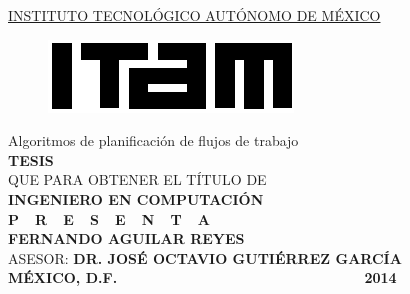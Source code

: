 \begin{titlepage}
\begin{center}

\textsc{\underline{INSTITUTO TECNOLÓGICO AUTÓNOMO DE MÉXICO}}\\[1.5cm] %

\begin{figure}[h]
\centering
\includegraphics[scale=2]{imagenes/logoitam.png}\\[1.4cm] %
\end{figure} 

\huge{Algoritmos de planificación de flujos de trabajo}\\[2.6cm] %

\large \textbf{TESIS}\\ QUE PARA OBTENER EL TÍTULO DE\\ \textbf{INGENIERO EN COMPUTACIÓN}\\[0.8cm]
\large \textbf{P\ \  R\ \  E\ \  S\ \  E\ \  N\ \  T\ \  A}\\[0.8cm]

\textbf{FERNANDO AGUILAR REYES}\\[1.0cm]

\large ASESOR: \textbf{DR. JOSÉ OCTAVIO GUTIÉRREZ GARCÍA}\\[1.4cm]

\large \textbf{MÉXICO, D.F.} {\ \ \ \ \ \ \ \ \ \ \ \ \ \ \ \ \ \ \ \ \ \ \ \ \ \ \ \ \ \ \ \ \ \ } \textbf{2014}

\vfill
\end{center}

\end{titlepage}
